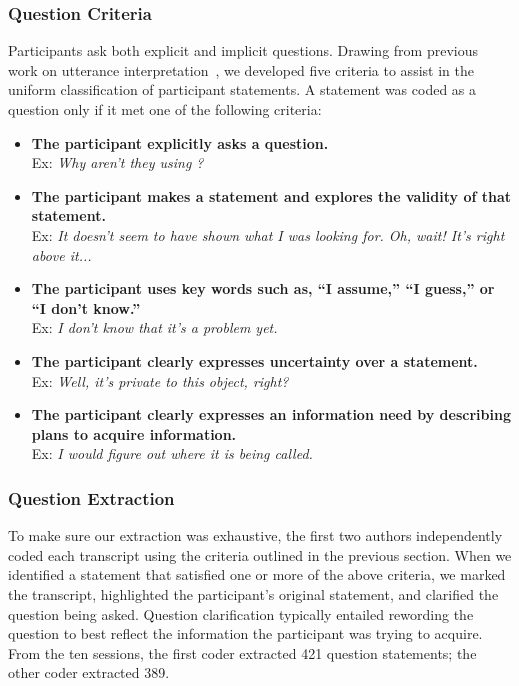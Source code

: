 \documentclass[10pt,journal,compsoc]{IEEEtran}
\newcommand{\compresslist}{
	\vspace{-1em}
	\setlength{\itemsep}{1pt}
	\setlength{\parskip}{0pt}
	\setlength{\parsep}{0pt}
}
\begin{document}
\subsubsection{Question Criteria}
Participants ask both explicit and implicit questions. 
Drawing from previous work on utterance interpretation~\cite{letovsky1987cognitive}, we developed five criteria to assist in the uniform classification of participant statements. 
A statement was coded as a question only if it met one of the following criteria:
\\
\begin{itemize}
\compresslist	
\item \textbf{The participant explicitly asks a question.}
\\ Ex: \textit{Why aren't they using ?}
\item \textbf{The participant makes a statement and explores the validity of that statement.}
\\ Ex: \textit{It doesn't seem to have shown what I was looking for. Oh, wait! It's right above it...}
\item \textbf{The participant uses key words such as, ``I assume,'' ``I guess,'' or ``I don't know.''}
\\ Ex: \textit{I don't know that it's a problem yet.}
\item \textbf{The participant clearly expresses uncertainty over a statement.}
\\ Ex: \textit{Well, it's private to this object, right?}
\item \textbf{The participant clearly expresses an information need by describing plans to acquire information.}
\\ Ex: \textit{I would figure out where it is being called.}

\end{itemize}




\subsubsection{Question Extraction}
To make sure our extraction was exhaustive, the first two authors independently coded each transcript using the criteria outlined in the previous section.
When we identified a statement that satisfied one or more of the above criteria, we marked the transcript, highlighted the participant's original statement, and clarified the question being asked.
Question clarification typically entailed rewording the question to best reflect the information the participant was trying to acquire.
From the ten sessions, the first coder extracted 421 question statements; the other coder extracted 389. 
\end{document}
